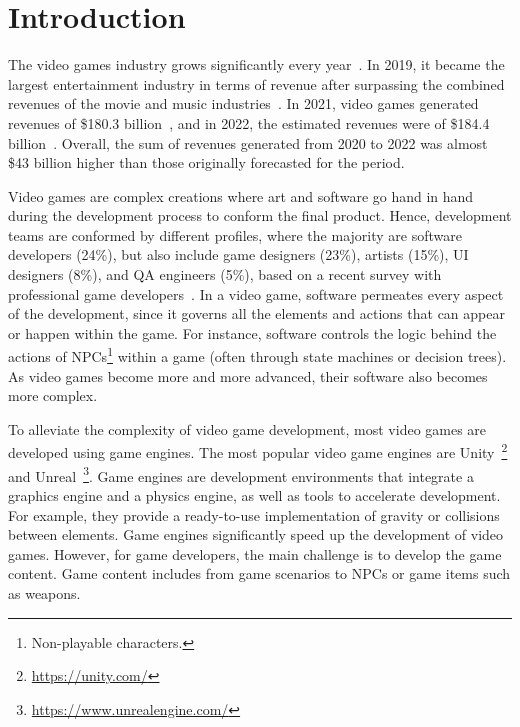 \section{Introduction}
\label{sec:intro}


The video games industry grows significantly every year~\cite{rykala2020growth}. In 2019, it became the largest entertainment industry in terms of revenue after surpassing the combined revenues of the movie and music industries~\cite{politowski2021game}. In 2021, video games generated revenues of \$180.3 billion~\cite{wijman2021games}, and in 2022, the estimated revenues were of \$184.4 billion~\cite{wijman2022games}. Overall, the sum of revenues generated from 2020 to 2022 was almost \$43 billion higher than those originally forecasted for the period. 


Video games are complex creations where art and software go hand in hand during the development process to conform the final product. Hence, development teams are conformed by different profiles, where the majority are software developers (24\%), but also include game designers (23\%), artists (15\%), UI designers (8\%), and QA engineers (5\%), based on a recent survey with professional game developers~\cite{devNation}. In a video game, software permeates every aspect of the development, since it governs all the elements and actions that can appear or happen within the game. For instance, software controls the logic behind the actions of NPCs\footnote{Non-playable characters.} within a game (often through state machines or decision trees). As video games become more and more advanced, their software also becomes more complex.

To alleviate the complexity of video game development, most video games are developed using game engines. The most popular video game engines are Unity~\footnote{\url{https://unity.com/}} and Unreal~\footnote{\url{https://www.unrealengine.com/}}. Game engines are development environments that integrate a graphics engine and a physics engine, as well as tools to accelerate development. For example, they provide a ready-to-use implementation of gravity or collisions between elements. Game engines significantly speed up the development of video games. However, for game developers, the main challenge is to develop the game content. Game content includes from game scenarios to NPCs or game items such as weapons.

